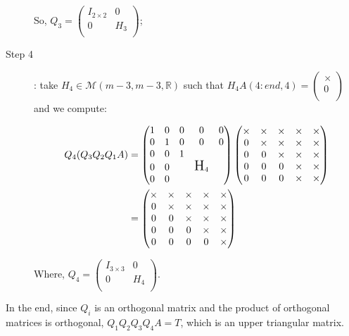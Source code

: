 \documentclass[ComputationalMathematics.tex]{subfiles}
\begin{document}
\begin{example}
\begin{description}
      So, $Q_{3} =
      \begin{pmatrix}
        I_{2 \times 2} & 0\\
        0 & H_{3}\\
      \end{pmatrix}$;

  \item[{\sc Step 4}]: take $H_{4} \in \mathcal{M}(m-3, m-3, \mathds{R})$ such that $H_{4}A(4:end, 4) = \begin{pmatrix} \times\\ 0\\ \end{pmatrix}$ and we compute:

   \begin{equation}
        \begin{aligned}
          Q_4 (Q_3 Q_2 Q_1 A)
          &=  \begin{pmatrix}
          1 & 0 & 0 & 0 & 0\\
          0 & 1 & 0 & 0 & 0\\
          0 & 0 & 1 & \\
          0 & 0 && \text{\Large H}_4\\
          0 & 0 &&\\
        \end{pmatrix}
        \begin{pmatrix}
          \times & \times & \times & \times & \times\\
          0 & \times & \times & \times & \times\\
          0 & 0 & \times & \times & \times\\
          0 & 0 & 0 & \times & \times\\
          0 & 0 & 0 & \times & \times\\
        \end{pmatrix}\\
        &= \begin{pmatrix}
          \times & \times & \times & \times & \times\\
          0 & \times & \times & \times & \times\\
          0 & 0 & \times & \times & \times\\
          0 & 0 & 0 & \times & \times\\
          0 & 0 & 0 & 0 & \times\\
        \end{pmatrix}
        \end{aligned}
      \end{equation}

Where, $Q_{4} =
      \begin{pmatrix}
        I_{3 \times 3} & 0\\
        0 & H_{4}\\
      \end{pmatrix}$. 
\end{description}

  In the end, since $Q_{i}$ is an orthogonal matrix and the product of orthogonal matrices is orthogonal, $Q_{1} Q_{2} Q_{3} Q_{4} A = T$, which is an upper triangular matrix.
\end{example}
\end{document}
